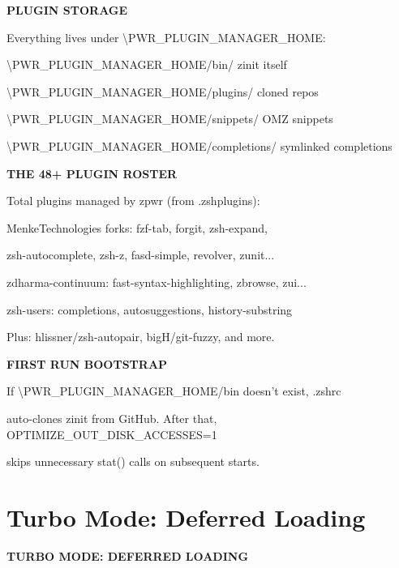 \documentclass[11pt,a4paper,twoside]{book}
\begin{document}
\vspace{12pt}
{\bfseries\color{neonyellow} PLUGIN STORAGE}\vspace{4pt}

Everything lives under \textbackslash{}PWR\_PLUGIN\_MANAGER\_HOME:

\textbackslash{}PWR\_PLUGIN\_MANAGER\_HOME/bin/         zinit itself

\textbackslash{}PWR\_PLUGIN\_MANAGER\_HOME/plugins/     cloned repos

\textbackslash{}PWR\_PLUGIN\_MANAGER\_HOME/snippets/    OMZ snippets

\textbackslash{}PWR\_PLUGIN\_MANAGER\_HOME/completions/  symlinked completions


\vspace{12pt}
{\bfseries\color{neonyellow} THE 48+ PLUGIN ROSTER}\vspace{4pt}

Total plugins managed by zpwr (from .zshplugins):

MenkeTechnologies forks: fzf-tab, forgit, zsh-expand,

zsh-autocomplete, zsh-z, fasd-simple, revolver, zunit...

zdharma-continuum: fast-syntax-highlighting, zbrowse, zui...

zsh-users: completions, autosuggestions, history-substring

Plus: hlissner/zsh-autopair, bigH/git-fuzzy, and more.


\vspace{12pt}
{\bfseries\color{neonyellow} FIRST RUN BOOTSTRAP}\vspace{4pt}

If \textbackslash{}PWR\_PLUGIN\_MANAGER\_HOME/bin doesn't exist, .zshrc

auto-clones zinit from GitHub. After that, OPTIMIZE\_OUT\_DISK\_ACCESSES=1

skips unnecessary stat() calls on subsequent starts.


\vspace{16pt}

\section{Turbo Mode: Deferred Loading}


\vspace{10pt}
{\large\bfseries\color{neoncyan} TURBO MODE: DEFERRED LOADING}\vspace{6pt}
\end{document}

